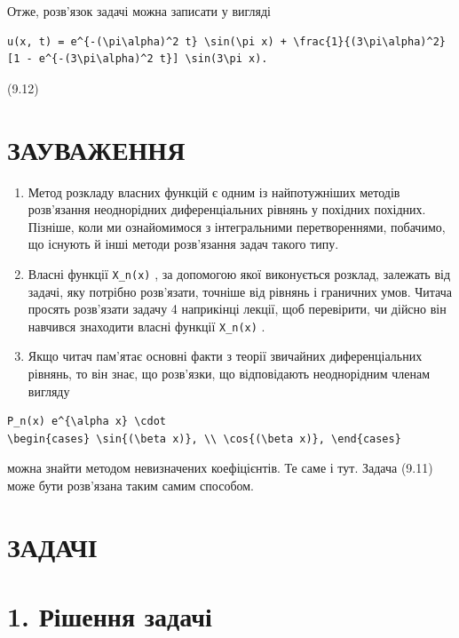 \documentclass[
  ukrainian,
]{article}
\begin{document}
Отже, розв'язок задачі можна записати у вигляді

\begin{verbatim}
u(x, t) = e^{-(\pi\alpha)^2 t} \sin(\pi x) + \frac{1}{(3\pi\alpha)^2} [1 - e^{-(3\pi\alpha)^2 t}] \sin(3\pi x).
\end{verbatim}

(9.12)

\section{ЗАУВАЖЕННЯ}\label{ux437ux430ux443ux432ux430ux436ux435ux43dux43dux44f-4}

\begin{enumerate}
\def\labelenumi{\arabic{enumi}.}
\item
  Метод розкладу власних функцій є одним із найпотужніших методів
  розв'язання неоднорідних диференціальних рівнянь у похідних похідних.
  Пізніше, коли ми ознайомимося з інтегральними перетвореннями,
  побачимо, що існують й інші методи розв'язання задач такого типу.
\item
  Власні функції \texttt{X\_n(x)} , за допомогою якої виконується
  розклад, залежать від задачі, яку потрібно розв'язати, точніше від
  рівнянь і граничних умов. Читача просять розв'язати задачу 4
  наприкінці лекції, щоб перевірити, чи дійсно він навчився знаходити
  власні функції \texttt{X\_n(x)} .
\item
  Якщо читач пам'ятає основні факти з теорії звичайних диференціальних
  рівнянь, то він знає, що розв'язки, що відповідають неоднорідним
  членам вигляду
\end{enumerate}

\begin{verbatim}
P_n(x) e^{\alpha x} \cdot
\begin{cases} \sin{(\beta x)}, \\ \cos{(\beta x)}, \end{cases}
\end{verbatim}

можна знайти методом невизначених коефіцієнтів. Те саме і тут. Задача
(9.11) може бути розв'язана таким самим способом.

\section{ЗАДАЧІ}\label{ux437ux430ux434ux430ux447ux456}

\section{1. Рішення
задачі}\label{ux440ux456ux448ux435ux43dux43dux44f-ux437ux430ux434ux430ux447ux456}
\end{document}
